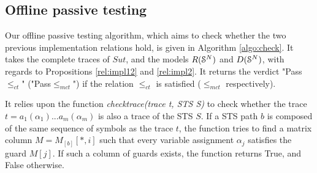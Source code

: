 \subsection{Offline passive testing}
\label{sec:testing:offline}

Our offline passive testing algorithm, which aims to check
whether the two previous implementation relations hold, is given
in Algorithm \ref{algo:check}. It takes the complete traces of
$\mathit{Sut}$, and the models $R(\EuScript{S}^{N})$ and
$D(\EuScript{S}^{N})$, with regards to Propositions
\ref{rel:impl12} and \ref{rel:impl2}. It returns the verdict
"Pass$\leq_{ct}$" ("Pass$\leq_{mct}$") if the relation
$\leq_{ct}$ is satisfied ($\leq_{mct}$ respectively).

It relies upon the function \textit{checktrace(trace t, STS S)}
to check whether the trace $t=a_1(\alpha_1)...a_m(\alpha_m)$ is
also a trace of the STS $S$. If a STS path $b$ is composed of the
same sequence of symbols as the trace $t$, the function tries to
find a matrix column  $M=M_{[b]}[*,i]$ such that every variable
assignment $\alpha_j$ satisfies the guard $M[j]$. If such a
column of guards exists, the function returns True, and False
otherwise.

